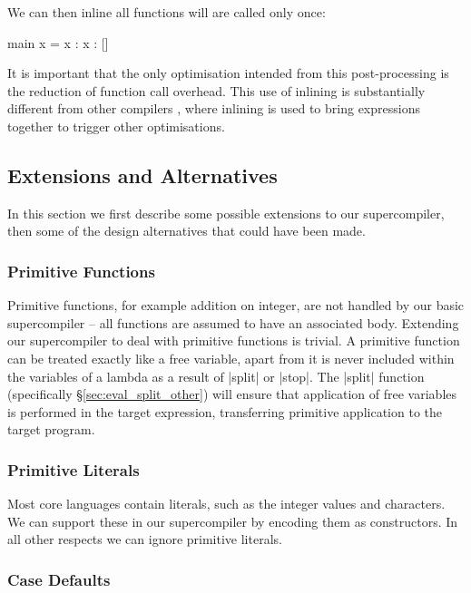 \documentclass[draft]{sigplanconf}
\begin{document}
We can then inline all functions will are called only once:

\begin{code}
main x = x : x : []
\end{code}

It is important that the only optimisation intended from this post-processing is the reduction of function call overhead. This use of inlining is substantially different from other compilers \cite{spj:inlining}, where inlining is used to bring expressions together to trigger other optimisations.

\subsection{Extensions and Alternatives}
\label{sec:extensions}

In this section we first describe some possible extensions to our supercompiler, then some of the design alternatives that could have been made.

\subsubsection{Primitive Functions}

Primitive functions, for example addition on integer, are not handled by our basic supercompiler -- all functions are assumed to have an associated body. Extending our supercompiler to deal with primitive functions is trivial. A primitive function can be treated exactly like a free variable, apart from it is never included within the variables of a lambda as a result of |split| or |stop|. The |split| function (specifically \S\ref{sec:eval_split_other}) will ensure that application of free variables is performed in the target expression, transferring primitive application to the target program.

\subsubsection{Primitive Literals}

Most core languages contain literals, such as the integer values and characters. We can support these in our supercompiler by encoding them as constructors. In all other respects we can ignore primitive literals.

\subsubsection{Case Defaults}
\end{document}

